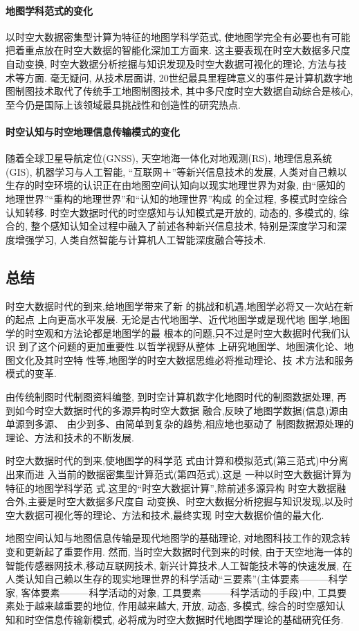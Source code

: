 \documentclass[12pt, a4paper, UTF8]{article}
\begin{document}
\paragraph*{地图学科范式的变化}

以时空大数据密集型计算为特征的地图学科学范式, 使地图学完全有必要也有可能把着重点放在时空大数据的智能化深加工方面来. 这主要表现在时空大数据多尺度自动变换, 时空大数据分析挖掘与知识发现及时空大数据可视化的理论, 方法与技术等方面. 毫无疑问, 从技术层面讲, 20世纪最具里程碑意义的事件是计算机数字地图制图技术取代了传统手工地图制图技术, 其中多尺度时空大数据自动综合是核心, 至今仍是国际上该领域最具挑战性和创造性的研究热点.

\paragraph*{时空认知与时空地理信息传输模式的变化}

随着全球卫星导航定位(GNSS), 天空地海一体化对地观测(RS), 地理信息系统(GIS), 机器学习与人工智能, ``互联网＋''等新兴信息技术的发展, 人类对自己赖以生存的时空环境的认识正在由地图空间认知向以现实地理世界为对象, 由``感知的地理世界''``重构的地理世界''和``认知的地理世界''构成 的全过程, 多模式时空综合认知转移. 时空大数据时代的时空感知与认知模式是开放的, 动态的, 多模式的, 综合的, 整个感知认知全过程中融入了前述各种新兴信息技术, 特别是深度学习和深度增强学习, 人类自然智能与计算机人工智能深度融合等技术.

\subsection{总结}
时空大数据时代的到来,给地图学带来了新 的挑战和机遇,地图学必将又一次站在新的起点 上向更高水平发展. 无论是古代地图学、近代地图学或是现代地 图学,地图学的时空观和方法论都是地图学的最 根本的问题,只不过是时空大数据时代我们认识 到了这个问题的更加重要性.以哲学视野从整体 上研究地图学、地图演化论、地图文化及其时空特 性等,地图学的时空大数据思维必将推动理论、技 术方法和服务模式的变革.

由传统制图时代制图资料编整, 到时空计算机数字化地图时代的制图数据处理, 再到如今时空大数据时代的多源异构时空大数据 融合,反映了地图学数据(信息)源由单源到多源、 由少到多、由简单到复杂的趋势,相应地也驱动了 制图数据源处理的理论、方法和技术的不断发展.

时空大数据时代的到来,使地图学的科学范 式由计算和模拟范式(第三范式)中分离出来而进 入当前的数据密集型计算范式(第四范式),这是 一种以时空大数据计算为特征的地图学科学范 式.这里的“时空大数据计算”,除前述多源异构 时空大数据融合外,主要是时空大数据多尺度自 动变换、时空大数据分析挖掘与知识发现,以及时 空大数据可视化等的理论、方法和技术,最终实现 时空大数据价值的最大化. 

地图空间认知与地图信息传输是现代地图学的基础理论, 对地图科技工作的观念转变和更新起了重要作用. 然而, 当时空大数据时代到来的时候, 由于天空地海一体的智能传感器网技术,移动互联网技术, 新兴计算技术,人工智能技术等的快速发展, 在人类认知自己赖以生存的现实地理世界的科学活动``三要素''(主体要素———科学家, 客体要素———科学活动的对象, 工具要素———科学活动的手段)中, 工具要素处于越来越重要的地位, 作用越来越大, 开放, 动态, 多模式, 综合的时空感知认知和时空信息传输新模式, 必将成为时空大数据时代地图学理论的基础研究任务. 
\end{document}
